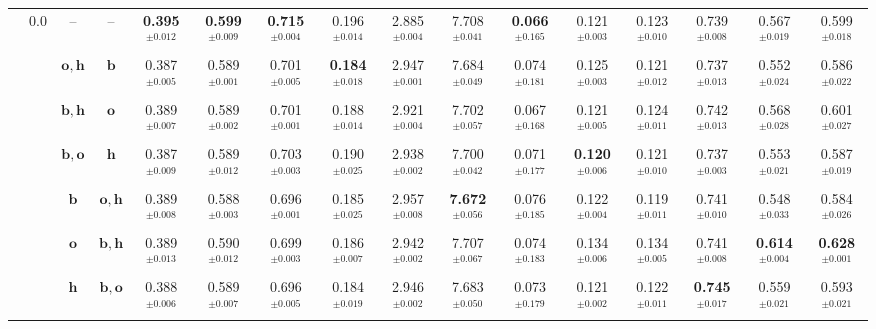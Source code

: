 \begin{table}
{\begin{tabular}{@{}cccccccccccccccc@{}}
        \multirow{7}{*}{\citep{xu2025interact}} & \multirow{7}{*}{$0.0$} & -- & --
        & \textbf{0.395$^{\pm0.012}$} & \textbf{0.599$^{\pm0.009}$} & \textbf{0.715$^{\pm0.004}$} & 0.196$^{\pm0.014}$ & 2.885$^{\pm0.004}$ & 7.708$^{\pm0.041}$ & \textbf{0.066$^{\pm0.165}$} & 0.121$^{\pm0.003}$ & 0.123$^{\pm0.010}$ & 0.739$^{\pm0.008}$ & 0.567$^{\pm0.019}$ & 0.599$^{\pm0.018}$ \\
        & & $\boldsymbol{o}, \boldsymbol{h}$ & $\boldsymbol{b}$
        & 0.387$^{\pm0.005}$ & 0.589$^{\pm0.001}$ & 0.701$^{\pm0.005}$ & \textbf{0.184$^{\pm0.018}$} & 2.947$^{\pm0.001}$ & 7.684$^{\pm0.049}$ & 0.074$^{\pm0.181}$ & 0.125$^{\pm0.003}$ & 0.121$^{\pm0.012}$ & 0.737$^{\pm0.013}$ & 0.552$^{\pm0.024}$ & 0.586$^{\pm0.022}$ \\
        & & $\boldsymbol{b}, \boldsymbol{h}$ & $\boldsymbol{o}$
        & 0.389$^{\pm0.007}$ & 0.589$^{\pm0.002}$ & 0.701$^{\pm0.001}$ & 0.188$^{\pm0.014}$ & 2.921$^{\pm0.004}$ & 7.702$^{\pm0.057}$ & 0.067$^{\pm0.168}$ & 0.121$^{\pm0.005}$ & 0.124$^{\pm0.011}$ & 0.742$^{\pm0.013}$ & 0.568$^{\pm0.028}$ & 0.601$^{\pm0.027}$ \\
        & & $\boldsymbol{b}, \boldsymbol{o}$ & $\boldsymbol{h}$
        & 0.387$^{\pm0.009}$ & 0.589$^{\pm0.012}$ & 0.703$^{\pm0.003}$ & 0.190$^{\pm0.025}$ & 2.938$^{\pm0.002}$ & 7.700$^{\pm0.042}$ & 0.071$^{\pm0.177}$ & \textbf{0.120$^{\pm0.006}$} & 0.121$^{\pm0.010}$ & 0.737$^{\pm0.003}$ & 0.553$^{\pm0.021}$ & 0.587$^{\pm0.019}$  \\
        & & $\boldsymbol{b}$ & $\boldsymbol{o}, \boldsymbol{h}$
        & 0.389$^{\pm0.008}$ & 0.588$^{\pm0.003}$ & 0.696$^{\pm0.001}$ & 0.185$^{\pm0.025}$ & 2.957$^{\pm0.008}$ & \textbf{7.672$^{\pm0.056}$} & 0.076$^{\pm0.185}$ & 0.122$^{\pm0.004}$ & 0.119$^{\pm0.011}$ & 0.741$^{\pm0.010}$ & 0.548$^{\pm0.033}$ & 0.584$^{\pm0.026}$ \\
        & & $\boldsymbol{o}$ & $\boldsymbol{b}, \boldsymbol{h}$
        & 0.389$^{\pm0.013}$ & 0.590$^{\pm0.012}$ & 0.699$^{\pm0.003}$ & 0.186$^{\pm0.007}$ & 2.942$^{\pm0.002}$ & 7.707$^{\pm0.067}$ & 0.074$^{\pm0.183}$ & 0.134$^{\pm0.006}$ & 0.134$^{\pm0.005}$ & 0.741$^{\pm0.008}$ & \textbf{0.614$^{\pm0.004}$} & \textbf{0.628$^{\pm0.001}$} \\
        & & $\boldsymbol{h}$ & $\boldsymbol{b}, \boldsymbol{o}$
        & 0.388$^{\pm0.006}$ & 0.589$^{\pm0.007}$ & 0.696$^{\pm0.005}$ & 0.184$^{\pm0.019}$ & 2.946$^{\pm0.002}$ & 7.683$^{\pm0.050}$ & 0.073$^{\pm0.179}$ & 0.121$^{\pm0.002}$ & 0.122$^{\pm0.011}$ & \textbf{0.745$^{\pm0.017}$} & 0.559$^{\pm0.021}$ & 0.593$^{\pm0.021}$ \\
        \midrule


\end{tabular}}
\end{table}
